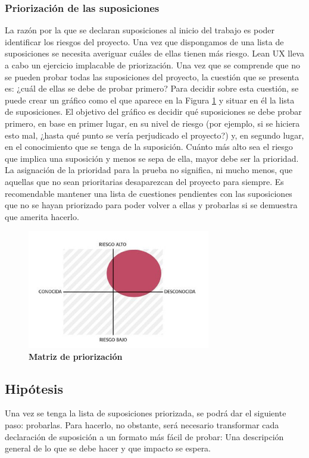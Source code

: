 \subsubsection{Priorización de las suposiciones} 
La razón por la que se declaran suposiciones al inicio del trabajo es poder identificar los riesgos del proyecto. Una vez que dispongamos de una lista de suposiciones se necesita averiguar cuáles de ellas tienen más riesgo. Lean UX lleva a cabo un ejercicio implacable de priorización. Una vez que se comprende que no se pueden probar todas las suposiciones del proyecto, la cuestión que se presenta es: ¿cuál de ellas se debe de probar primero? Para decidir sobre esta cuestión,  se puede crear un gráfico como el que aparece en la Figura \ref{fig:priori} y situar en él la lista de suposiciones. El objetivo del gráfico es decidir qué suposiciones se debe probar primero, en base en primer lugar, en su nivel de riesgo (por ejemplo, si se hiciera esto mal, ¿hasta qué punto se vería perjudicado el proyecto?) y, en segundo lugar, en el conocimiento que se tenga de la suposición. Cuánto más alto sea el riesgo que implica una suposición y menos se sepa de ella, mayor debe ser la prioridad. La asignación de la prioridad para la prueba no significa, ni mucho menos, que aquellas que no sean prioritarias desaparezcan del proyecto para siempre. Es recomendable mantener una lista de cuestiones pendientes con las suposiciones que no se hayan priorizado para poder volver a ellas y probarlas si se demuestra que amerita hacerlo.


\begin{figure}[h]
\includegraphics[width=8cm]{Img/UX/lean-supo.jpg}
\centering
\caption{\textbf{ \footnotesize{ Matriz de priorización }}}
\label{fig:priori}
\end{figure}


\subsection{Hipótesis}
Una vez se tenga la lista de suposiciones priorizada, se podrá dar el siguiente paso: probarlas. Para hacerlo, no obstante, será necesario transformar cada declaración de suposición a un formato más fácil de probar: Una descripción general de lo que se debe hacer y que impacto se espera. 


